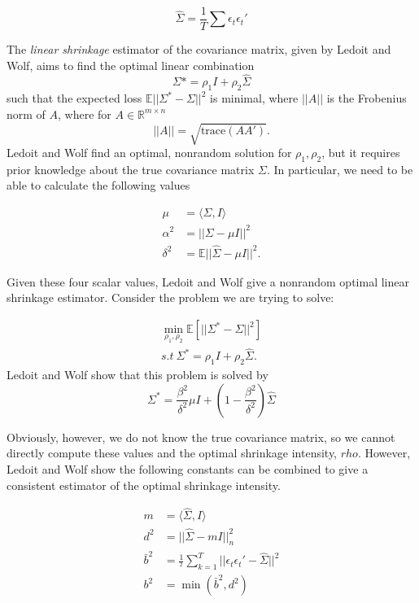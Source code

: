\documentclass{article} %
\numberwithin{equation}{section} %
\numberwithin{figure}{section} %
\numberwithin{table}{section} %
\begin{document}
\begin{equation} \label{eq: sample_covariance}
\hat{\Sigma} = \frac{1}{T} \sum \epsilon_t \epsilon_t'
\end{equation}

The \textit{linear shrinkage} estimator of the covariance matrix, given by Ledoit and Wolf, aims to find the optimal linear combination
\begin{equation}
\Sigma* = \rho_1 I + \rho_2 \hat{\Sigma}
\end{equation}
such that the expected loss $\mathbb{E}||\Sigma^* - \Sigma||^2$ is minimal, where $||A||$ is the Frobenius norm of $A$, where for $A \in \mathbb{R}^{m \times n}$
\begin{equation}
||A|| = \sqrt{\text{trace}(AA')}.
\end{equation}
Ledoit and Wolf find an optimal, nonrandom solution for $\rho_1, \rho_2$, but it requires prior knowledge about the true covariance matrix $\Sigma$. In particular, we need to be able to calculate the following values

\begin{align}
\mu &= \langle \Sigma , I \rangle \nonumber \\
\alpha^2 &= || \Sigma - \mu I ||^2 \nonumber \\
\delta^2 &= \mathbb{E}||\hat{\Sigma} - \mu I ||^2.
\end{align}

Given these four scalar values, Ledoit and Wolf give a nonrandom optimal linear shrinkage estimator. Consider the problem we are trying to solve:

\begin{align}
\nonumber
\min\limits_{\rho_1, \rho_2} \mathbb{E} \left[ || \Sigma^* - \Sigma ||^2 \right]\\
s.t  \ \Sigma ^* = \rho_1 I + \rho_2 \hat{\Sigma}.
\end{align}
Ledoit and Wolf show that this problem is solved by
\begin{equation}
\Sigma ^* = \frac{\beta^2}{\delta^2} \mu I + \left(1 - \frac{\beta^2}{\delta^2}\right) \hat{\Sigma}
\end{equation}

Obviously, however, we do not know the true covariance matrix, so we cannot directly compute these values and the optimal shrinkage intensity, $rho$. However, Ledoit and Wolf show the following constants can be combined to give a consistent estimator of the optimal shrinkage intensity.

\begin{align}
\nonumber
m &= \langle \hat{\Sigma}, I \rangle \\
\nonumber
d^2 &= ||\hat{\Sigma} - mI||^2_n \\
\nonumber
\bar{b}^2 &= \frac{1}{^2} \sum\limits_{k=1}^{T} ||\epsilon_t \epsilon_t' - \hat{\Sigma}||^2 \\
b^2 &= \min(\bar{b}^2, d^2)
\end{align}
\end{document}
